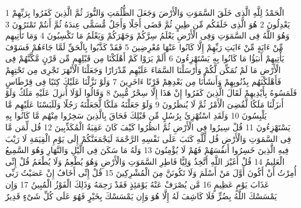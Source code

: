 \documentclass[20pt,a4paper]{article}
\title{}
\author{}
\date{}
\begin{document}
\pagecolor{cl_page}



{\tiny\colorbox{cl_aya}{1}} الْحَمْدُ لِلَّهِ الَّذِى خَلَقَ السَّمَوَتِ وَالْأَرْضَ وَجَعَلَ الظُّلُمَتِ وَالنُّورَ ثُمَّ الَّذِينَ كَفَرُوا بِرَبِّهِمْ يَعْدِلُونَ
{\tiny\colorbox{cl_aya}{2}} هُوَ الَّذِى خَلَقَكُم مِّن طِينٍ ثُمَّ قَضَى أَجَلًا وَأَجَلٌ مُّسَمًّى عِندَهُ ثُمَّ أَنتُمْ تَمْتَرُونَ
{\tiny\colorbox{cl_aya}{3}} وَهُوَ اللَّهُ فِى السَّمَوَتِ وَفِى الْأَرْضِ يَعْلَمُ سِرَّكُمْ وَجَهْرَكُمْ وَيَعْلَمُ مَا تَكْسِبُونَ
{\tiny\colorbox{cl_aya}{4}} وَمَا تَأْتِيهِم مِّنْ ءَايَةٍ مِّنْ ءَايَتِ رَبِّهِمْ إِلَّا كَانُوا عَنْهَا مُعْرِضِينَ
{\tiny\colorbox{cl_aya}{5}} فَقَدْ كَذَّبُوا بِالْحَقِّ لَمَّا جَاءَهُمْ فَسَوْفَ يَأْتِيهِمْ أَنبَؤُا مَا كَانُوا بِهِ يَسْتَهْزِءُونَ
{\tiny\colorbox{cl_aya}{6}} أَلَمْ يَرَوْا كَمْ أَهْلَكْنَا مِن قَبْلِهِم مِّن قَرْنٍ مَّكَّنَّهُمْ فِى الْأَرْضِ مَا لَمْ نُمَكِّن لَّكُمْ وَأَرْسَلْنَا السَّمَاءَ عَلَيْهِم مِّدْرَارًا وَجَعَلْنَا الْأَنْهَرَ تَجْرِى مِن تَحْتِهِمْ فَأَهْلَكْنَهُم بِذُنُوبِهِمْ وَأَنشَأْنَا مِن بَعْدِهِمْ قَرْنًا ءَاخَرِينَ
{\tiny\colorbox{cl_aya}{7}} وَلَوْ نَزَّلْنَا عَلَيْكَ كِتَبًا فِى قِرْطَاسٍ فَلَمَسُوهُ بِأَيْدِيهِمْ لَقَالَ الَّذِينَ كَفَرُوا إِنْ هَذَا إِلَّا سِحْرٌ مُّبِينٌ
{\tiny\colorbox{cl_aya}{8}} وَقَالُوا لَوْلَا أُنزِلَ عَلَيْهِ مَلَكٌ وَلَوْ أَنزَلْنَا مَلَكًا لَّقُضِىَ الْأَمْرُ ثُمَّ لَا يُنظَرُونَ
{\tiny\colorbox{cl_aya}{9}} وَلَوْ جَعَلْنَهُ مَلَكًا لَّجَعَلْنَهُ رَجُلًا وَلَلَبَسْنَا عَلَيْهِم مَّا يَلْبِسُونَ
{\tiny\colorbox{cl_aya}{10}} وَلَقَدِ اسْتُهْزِئَ بِرُسُلٍ مِّن قَبْلِكَ فَحَاقَ بِالَّذِينَ سَخِرُوا مِنْهُم مَّا كَانُوا بِهِ يَسْتَهْزِءُونَ
{\tiny\colorbox{cl_aya}{11}} قُلْ سِيرُوا فِى الْأَرْضِ ثُمَّ انظُرُوا كَيْفَ كَانَ عَقِبَةُ الْمُكَذِّبِينَ
{\tiny\colorbox{cl_aya}{12}} قُل لِّمَن مَّا فِى السَّمَوَتِ وَالْأَرْضِ قُل لِّلَّهِ كَتَبَ عَلَى نَفْسِهِ الرَّحْمَةَ لَيَجْمَعَنَّكُمْ إِلَى يَوْمِ الْقِيَمَةِ لَا رَيْبَ فِيهِ الَّذِينَ خَسِرُوا أَنفُسَهُمْ فَهُمْ لَا يُؤْمِنُونَ
{\tiny\colorbox{cl_aya}{13}} وَلَهُ مَا سَكَنَ فِى الَّيْلِ وَالنَّهَارِ وَهُوَ السَّمِيعُ الْعَلِيمُ
{\tiny\colorbox{cl_aya}{14}} قُلْ أَغَيْرَ اللَّهِ أَتَّخِذُ وَلِيًّا فَاطِرِ السَّمَوَتِ وَالْأَرْضِ وَهُوَ يُطْعِمُ وَلَا يُطْعَمُ قُلْ إِنِّى أُمِرْتُ أَنْ أَكُونَ أَوَّلَ مَنْ أَسْلَمَ وَلَا تَكُونَنَّ مِنَ الْمُشْرِكِينَ
{\tiny\colorbox{cl_aya}{15}} قُلْ إِنِّى أَخَافُ إِنْ عَصَيْتُ رَبِّى عَذَابَ يَوْمٍ عَظِيمٍ
{\tiny\colorbox{cl_aya}{16}} مَّن يُصْرَفْ عَنْهُ يَوْمَئِذٍ فَقَدْ رَحِمَهُ وَذَلِكَ الْفَوْزُ الْمُبِينُ
{\tiny\colorbox{cl_aya}{17}} وَإِن يَمْسَسْكَ اللَّهُ بِضُرٍّ فَلَا كَاشِفَ لَهُ إِلَّا هُوَ وَإِن يَمْسَسْكَ بِخَيْرٍ فَهُوَ عَلَى كُلِّ شَىْءٍ قَدِيرٌ
\end{document}
